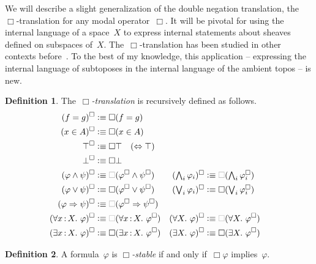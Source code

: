 \documentclass[10pt,reqno,a4paper]{amsbook}
\theoremstyle{definition}
\newtheorem{defn}{Definition}[section]
\theoremstyle{plain}
\theoremstyle{remark}
\newcommand{\?}{\,{:}\,}
\renewcommand{\_}{\mathpunct{.}\,}
\newcommand{\defequiv}{\vcentcolon\equiv}
\begin{document}
We will describe a slight generalization of the double negation translation,
the~$\Box$-translation for any modal operator~$\Box$. It will be pivotal
for using the internal language of a space~$X$ to express internal statements
about sheaves defined on subspaces of~$X$. The~$\Box$-translation has been studied
in other contexts
before~\cite{aczel:russell-prawitz,escardo:oliva:peirce-shift}. To the best of
my knowledge, this application -- expressing the internal language of
subtoposes in the internal language of the ambient topos -- is new.

\begin{defn}The~\emph{$\Box$-translation} is recursively defined as follows.
\newcommand{\optBox}{\textcolor{gray}{\Box}}
\begin{align*}
  (f = g)^\Box &\defequiv \Box(f = g) \\
  (x \in A)^\Box &\defequiv \Box(x \in A) \\
  \top^\Box &\defequiv \Box\top \quad \text{($\Leftrightarrow \top$)} \\
  \bot^\Box &\defequiv \Box\bot \\
  (\varphi \wedge \psi)^\Box &\defequiv \optBox(\varphi^\Box \wedge \psi^\Box) &
  \textstyle (\bigwedge_i \varphi_i)^\Box &\defequiv \textstyle \optBox(\bigwedge_i \varphi_i^\Box) \\
  (\varphi \vee \psi)^\Box &\defequiv \Box(\varphi^\Box \vee \psi^\Box) &
  \textstyle (\bigvee_i \varphi_i)^\Box &\defequiv \textstyle \Box(\bigvee_i \varphi_i^\Box) \\
  (\varphi \Rightarrow \psi)^\Box &\defequiv \optBox(\varphi^\Box \Rightarrow \psi^\Box) \\
  (\forall x\?X\_ \varphi)^\Box &\defequiv \optBox(\forall x\?X\_ \varphi^\Box) &
  (\forall X\_ \varphi)^\Box &\defequiv \optBox(\forall X\_ \varphi^\Box) \\
  (\exists x\?X\_ \varphi)^\Box &\defequiv \Box(\exists x\?X\_ \varphi^\Box) &
  (\exists X\_ \varphi)^\Box &\defequiv \Box(\exists X\_ \varphi^\Box)
\end{align*}
\end{defn}

\begin{defn}A formula~$\varphi$ is \emph{$\Box$-stable} if and only
if~$\Box\varphi$ implies~$\varphi$.\end{defn}
\end{document}
